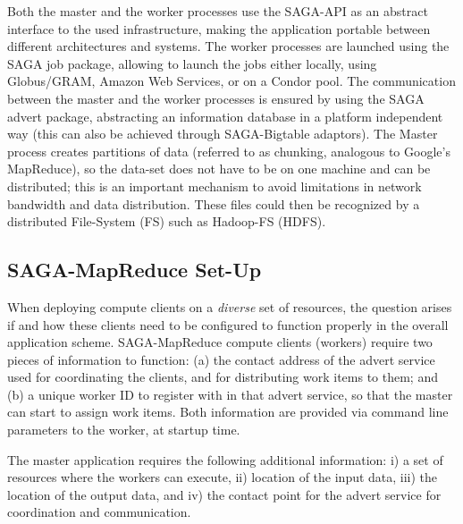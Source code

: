 \documentclass[conference,final]{IEEEtran}
\newcommand{\sagamapreduce }{SAGA-MapReduce }
\newcommand{\I}[1]{\textit{#1}}
\begin{document}
Both the master and the worker processes use the SAGA-API as an
abstract interface to the used infrastructure, making the application
portable between different architectures and systems. The worker
processes are launched using the SAGA job package, allowing to launch
the jobs either locally, using Globus/GRAM, Amazon Web Services, or on
a Condor pool. The communication between the master and the worker
processes is ensured by using the SAGA advert package, abstracting an
information database in a platform independent way (this can also be
achieved through SAGA-Bigtable adaptors).  The Master process creates
partitions of data (referred to as chunking, analogous to Google's
MapReduce), so the data-set does not have to be on one machine and can
be distributed; this is an important mechanism to avoid limitations in
network bandwidth and data distribution.  These files could then be
recognized by a distributed File-System (FS) such as Hadoop-FS
(HDFS). %

\subsection{\sagamapreduce Set-Up}
When deploying compute clients on a \I{diverse} set of resources, the
question arises if and how these clients need to be configured to
function properly in the overall application scheme.  \sagamapreduce
compute clients (workers) require two pieces of information to
function: (a) the contact address of the advert service used for
coordinating the clients, and for distributing work items to them; and
(b) a unique worker ID to register with in that advert service, so
that the master can start to assign work items.  Both information are
provided via command line parameters to the worker, at startup time.

The master application requires the following additional information:
i) a set of resources where the workers can execute, ii) location of
the input data, iii) the location of the output data, and iv) the
contact point for the advert service for coordination and
communication.  
\end{document}
